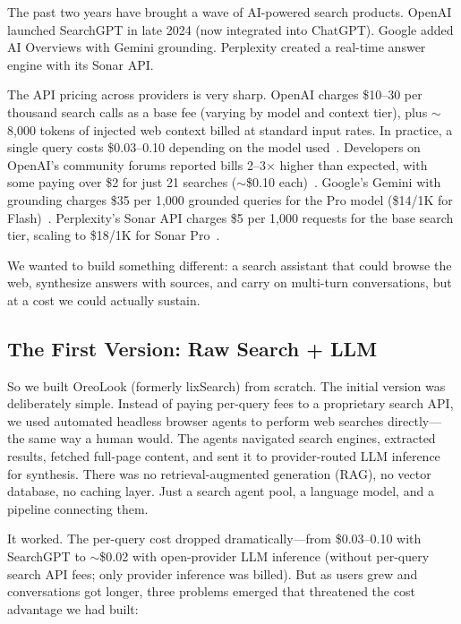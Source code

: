 \documentclass[conference]{IEEEtran}
\begin{document}
The past two years have brought a wave of AI-powered search products. OpenAI launched SearchGPT in late 2024 (now integrated into ChatGPT). Google added AI Overviews with Gemini grounding. Perplexity created a real-time answer engine with its Sonar API.

The API pricing across providers is very sharp. OpenAI charges \$10--30 per thousand search calls as a base fee (varying by model and context tier), plus ${\sim}$8{,}000 tokens of injected web context billed at standard input rates. In practice, a single query costs \$0.03--0.10 depending on the model used~\cite{openai_search_pricing}. Developers on OpenAI's community forums reported bills 2--3$\times$ higher than expected, with some paying over \$2 for just 21 searches (${\sim}$\$0.10 each)~\cite{openai_search_billing}. Google's Gemini with grounding charges \$35 per 1{,}000 grounded queries for the Pro model (\$14/1K for Flash)~\cite{google_grounding_pricing}. Perplexity's Sonar API charges \$5 per 1{,}000 requests for the base search tier, scaling to \$18/1K for Sonar Pro~\cite{perplexity_pricing}.

We wanted to build something different: a search assistant that could browse the web, synthesize answers with sources, and carry on multi-turn conversations, but at a cost we could actually sustain.

\subsection{The First Version: Raw Search + LLM}

So we built OreoLook (formerly lixSearch) from scratch. The initial version was deliberately simple. Instead of paying per-query fees to a proprietary search API, we used automated headless browser agents to perform web searches directly---the same way a human would. The agents navigated search engines, extracted results, fetched full-page content, and sent it to provider-routed LLM inference for synthesis. There was no retrieval-augmented generation (RAG), no vector database, no caching layer. Just a search agent pool, a language model, and a pipeline connecting them.

It worked. The per-query cost dropped dramatically---from \$0.03--0.10 with SearchGPT to ${\sim}$\$0.02 with open-provider LLM inference (without per-query search API fees; only provider inference was billed). But as users grew and conversations got longer, three problems emerged that threatened the cost advantage we had built:
\end{document}
